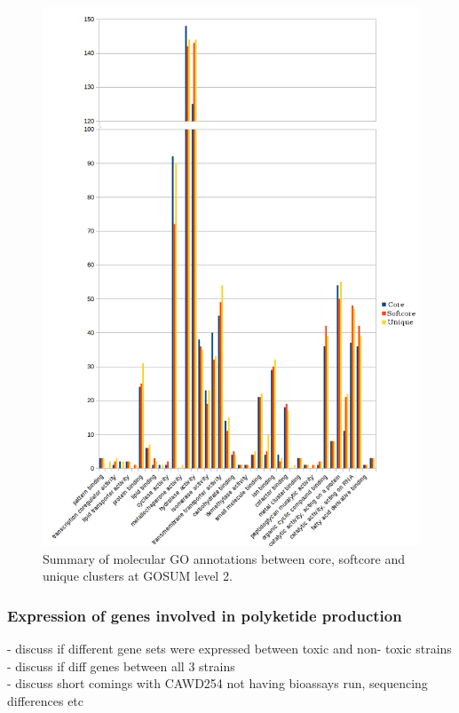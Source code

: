 \documentclass[12pt]{article}
\begin{document}
\begin{figure} 
\includegraphics[scale=.8]{3Aug18_cluster-investigation/figures/gosum-pan/Pan-gosum2-molec-split.png} 
\caption{Summary of molecular GO annotations between core, softcore and unique clusters at GOSUM level 2.} 
\label{fig:PanGo2Molec}
\end{figure} 
\FloatBarrier

\subsubsection*{Expression of genes involved in polyketide production}
- discuss if different gene sets were expressed between toxic and non- toxic strains\\
- discuss if diff genes between all 3 strains\\
- discuss short comings with CAWD254 not having bioassays run, sequencing differences etc
\end{document}
